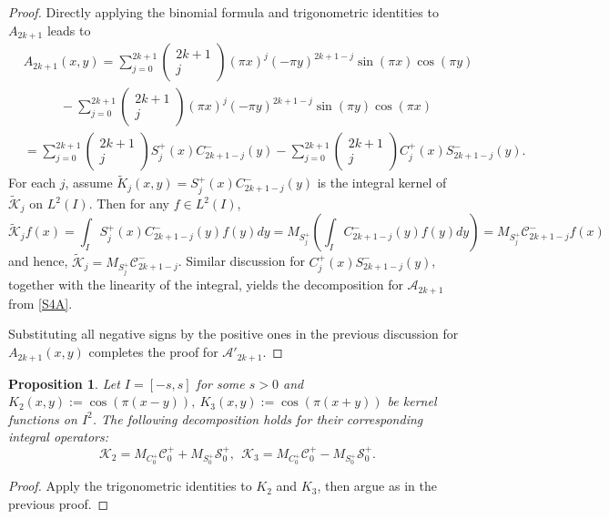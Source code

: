 \documentclass[11pt]{article}
\newtheorem{proposition}[theorem]{Proposition}
\numberwithin{equation}{section}%
\numberwithin{theorem}{section}
\begin{document}
\begin{proof}
Directly applying the binomial formula and trigonometric identities to $A_{2k+1}$ leads to
\begin{equation}\label{S4A}
    \begin{split}
        &A_{2k+1}(x,y)=\sum_{j=0}^{2k+1}\left(\begin{matrix}
            2k+1\\j
        \end{matrix}\right)(\pi x)^j(-\pi y)^{2k+1-j}\sin(\pi x)\cos(\pi y)\\&~~~~~~~~~~~~~-\sum_{j=0}^{2k+1}\left(\begin{matrix}
            2k+1\\j
        \end{matrix}\right)(\pi x)^j(-\pi y)^{2k+1-j}\sin(\pi y)\cos(\pi x)\\
        &=\sum_{j=0}^{2k+1}\left(\begin{matrix}
            2k+1\\j
        \end{matrix}\right)S_{j}^+(x)C_{2k+1-j}^{-}(y)-\sum_{j=0}^{2k+1}\left(\begin{matrix}
            2k+1\\j
        \end{matrix}\right)C_{j}^+(x)S_{2k+1-j}^-(y).
    \end{split}
\end{equation}
For each $j$, assume $\tilde{K}_j(x,y)=S_j^+(x)C_{2k+1-j}^-(y)$ is the integral kernel of $\tilde{\mathcal{K}}_{j}$ on $L^2(I)$. Then for any $f\in L^2(I)$, 
\begin{equation*}
    \tilde{\mathcal{K}}_jf(x)=\int_I S_j^+(x)C_{2k+1-j}^-(y)f(y)dy=M_{S_j^+}\left(\int_I C_{2k+1-j}^-(y)f(y)dy\right)=M_{S_j^+}\mathcal{C}_{2k+1-j}^-f(x)
\end{equation*}
and hence, $\tilde{\mathcal{K}}_j=M_{S_j^+}\mathcal{C}_{2k+1-j}^-$. Similar discussion for $C^+_j(x)S_{2k+1-j}^-(y)$, together with the linearity of the integral, yields the decomposition for $\mathcal{A}_{2k+1}$ from \eqref{S4A}.

Substituting all negative signs by the positive ones in the previous discussion for $A_{2k+1}(x,y)$ completes the proof for $\mathcal{A}'_{2k+1}$.
\end{proof}

\begin{proposition}\label{fac2}
    Let $I=[-s,s]$ for some $s>0$ and $K_2(x,y):=\cos\left(\pi(x-y)\right),~K_3(x,y):=\cos(\pi(x+y))$ be kernel functions on $I^2$. The following decomposition holds for their corresponding integral operators:
\begin{equation*}
\mathcal{K}_2=M_{C^+_0}\mathcal{C}^+_0+M_{S^+_0}\mathcal{S}^+_0,~~
\mathcal{K}_3=M_{C^+_0}\mathcal{C}^+_0-M_{S^+_0}\mathcal{S}^+_0.
\end{equation*}
\end{proposition}
\begin{proof}
    Apply the trigonometric identities to $K_2$ and $K_3$, then argue as in the previous proof.
\end{proof}
\end{document}
